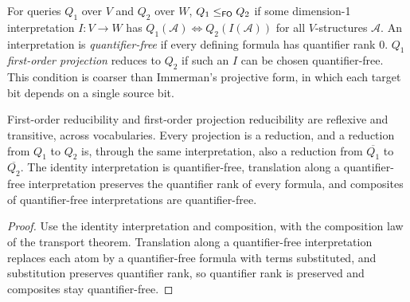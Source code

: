 \begin{definition}
  \label{def:desc-fo-reduction}
  \leanok
  For queries $Q_1$ over $V$ and $Q_2$ over $W$, $Q_1 \le_{\mathsf{FO}} Q_2$ if some
  dimension-1 interpretation $I : V \to W$ has
  $Q_1(\mathcal{A}) \iff Q_2(I(\mathcal{A}))$ for all $V$-structures
  $\mathcal{A}$. An interpretation is \emph{quantifier-free} if every defining
  formula has quantifier rank $0$. $Q_1$ \emph{first-order projection} reduces to
  $Q_2$ if such an $I$ can be chosen quantifier-free. This condition is coarser
  than Immerman's projective form, in which each target bit depends on a single
  source bit.
\end{definition}

\begin{theorem}
  \label{thm:desc-fo-reduction-preorder}
  \leanok
  First-order reducibility and first-order projection reducibility are reflexive
  and transitive, across vocabularies. Every projection is a reduction, and a
  reduction from $Q_1$ to $Q_2$ is, through the same interpretation, also a
  reduction from $\overline{Q_1}$ to $\overline{Q_2}$. The identity
  interpretation is quantifier-free, translation along a quantifier-free
  interpretation preserves the quantifier rank of every formula, and composites
  of quantifier-free interpretations are quantifier-free.
\end{theorem}
\begin{proof}
  \leanok
  Use the identity interpretation and composition, with the composition law of
  the transport theorem. Translation along a quantifier-free interpretation
  replaces each atom by a quantifier-free formula with terms substituted, and
  substitution preserves quantifier rank, so quantifier rank is preserved and
  composites stay quantifier-free.
\end{proof}

